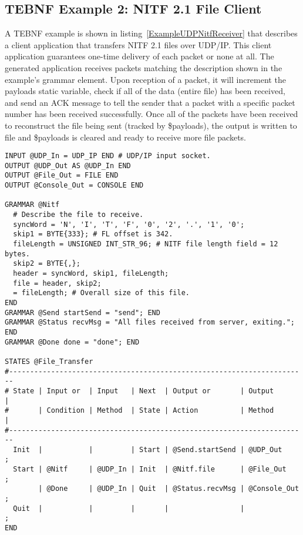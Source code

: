 \subsection{TEBNF Example 2: NITF 2.1 File Client}
A TEBNF example is shown in listing~\ref{ExampleUDPNitfReceiver} that describes a client application that transfers NITF 2.1 files over UDP/IP.  This client application guarantees one-time delivery of each packet or none at all.  The generated application receives packets matching the description shown in the example’s grammar element.  Upon reception of a packet, it will increment the payloads static variable, check if all of the data (entire file) has been received, and send an ACK message to tell the sender that a packet with a specific packet number has been received successfully.  Once all of the packets have been received to reconstruct the file being sent (tracked by \$payloads), the output is written to file and \$payloads is cleared and ready to receive more file packets.
\begin{lstlisting}[basicstyle=\small,caption={TEBNF grammar describing a UDP NITF 2.1 file transfer client.},label=ExampleUDPNitfReceiver]
INPUT @UDP_In = UDP_IP END # UDP/IP input socket.
OUTPUT @UDP_Out AS @UDP_In END
OUTPUT @File_Out = FILE END
OUTPUT @Console_Out = CONSOLE END

GRAMMAR @Nitf
  # Describe the file to receive.
  syncWord = 'N', 'I', 'T', 'F', '0', '2', '.', '1', '0';
  skip1 = BYTE{333}; # FL offset is 342.
  fileLength = UNSIGNED INT_STR_96; # NITF file length field = 12 bytes.
  skip2 = BYTE{,};
  header = syncWord, skip1, fileLength;
  file = header, skip2;
  = fileLength; # Overall size of this file.
END
GRAMMAR @Send startSend = "send"; END
GRAMMAR @Status recvMsg = "All files received from server, exiting."; END
GRAMMAR @Done done = "done"; END

STATES @File_Transfer
#-----------------------------------------------------------------------
# State | Input or  | Input   | Next  | Output or       | Output       |
#       | Condition | Method  | State | Action          | Method       |
#-----------------------------------------------------------------------
  Init  |           |         | Start | @Send.startSend | @UDP_Out     ;
  Start | @Nitf     | @UDP_In | Init  | @Nitf.file      | @File_Out    ;
        | @Done     | @UDP_In | Quit  | @Status.recvMsg | @Console_Out ;
  Quit  |           |         |       |                 |              ;
END
\end{lstlisting}


